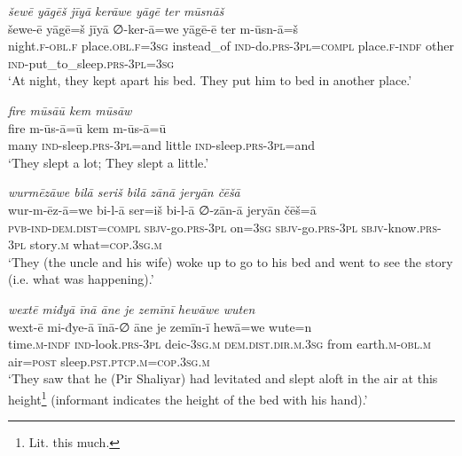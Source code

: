\ea \label{ŽP.65}
\textit{šewē yāgēš jīyā kerāwe yāgē ter mūsnāš} \\ 
\gll šewe-ē yāgē=š jīyā ∅-ker-ā=we yāgē-ē ter m-ūsn-ā=š \\ 
 night\textsc{.f}\textsc{-obl}\textsc{.f} place\textsc{.obl}\textsc{.f}\textsc{=3sg} instead\_of \textsc{ind-}do\textsc{.prs}\textsc{-3pl}\textsc{=compl} place\textsc{.f}\textsc{-indf} other \textsc{ind-}put\_to\_sleep\textsc{.prs}\textsc{-3pl}\textsc{=3sg} \\ 
\glt `At night, they kept apart his bed. They put him to bed in another place.'
\z 
 
\ea \label{ŽP.66}
\textit{fire mūsāū kem mūsāw} \\ 
\gll fire m-ūs-ā=ū kem m-ūs-ā=ū \\ 
 many \textsc{ind-}sleep\textsc{.prs}\textsc{-3pl}=and little \textsc{ind-}sleep\textsc{.prs}\textsc{-3pl}=and \\ 
\glt `They slept a lot; They slept a little.'
\z 
 
\ea \label{ŽP.67}
\textit{wurmēzāwe bilā seriš bilā zānā jeryān čēšā} \\ 
\gll wur-m-ēz-ā=we bi-l-ā ser=iš bi-l-ā ∅-zān-ā jeryān čēš=ā \\ 
 \textsc{pvb-}\textsc{ind-}\textsc{dem.dist}\textsc{=compl} \textsc{sbjv-}go\textsc{.prs}\textsc{-3pl} on\textsc{=3sg} \textsc{sbjv-}go\textsc{.prs}\textsc{-3pl} \textsc{sbjv-}know\textsc{.prs}\textsc{-3pl} story\textsc{.m} what\textsc{=cop}\textsc{.3sg}\textsc{.m} \\ 
\glt `They (the uncle and his wife) woke up to go to his bed and went to see the story (i.e. what was happening).'
\z 
 
\ea \label{ŽP.68}
\textit{wextē miđyā īnā āne je zemīnī hewāwe wuten} \\ 
\gll wext-ē mi-đye-ā īnā-∅ āne je zemīn-ī hewā=we wute=n \\ 
 time\textsc{.m}\textsc{-indf} \textsc{ind-}look\textsc{.prs}\textsc{-3pl} deic\textsc{-3sg}\textsc{.m} \textsc{dem.dist}\textsc{.dir}\textsc{.m}\textsc{.3sg} from earth\textsc{.m}\textsc{-obl}\textsc{.m} air\textsc{=\textsc{post}} sleep\textsc{.pst}\textsc{.ptcp}\textsc{.m}\textsc{=cop}\textsc{.3sg}\textsc{.m} \\ 
\glt `They saw that he (Pir Shaliyar) had levitated and slept aloft in the air at this height\footnote{Lit. this much.} (informant indicates the height of the bed with his hand).'
\z 
 
